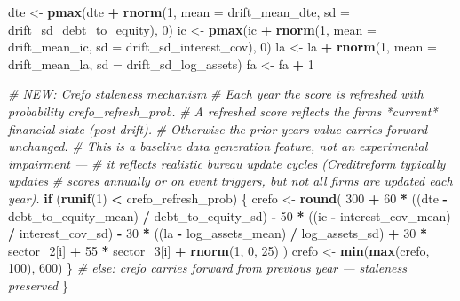 \documentclass[
]{article}
\newenvironment{Shaded}{\begin{snugshade}}{\end{snugshade}}
\newcommand{\AttributeTok}[1]{\textcolor[rgb]{0.13,0.29,0.53}{#1}}
\newcommand{\CommentTok}[1]{\textcolor[rgb]{0.56,0.35,0.01}{\textit{#1}}}
\newcommand{\ControlFlowTok}[1]{\textcolor[rgb]{0.13,0.29,0.53}{\textbf{#1}}}
\newcommand{\DecValTok}[1]{\textcolor[rgb]{0.00,0.00,0.81}{#1}}
\newcommand{\FunctionTok}[1]{\textcolor[rgb]{0.13,0.29,0.53}{\textbf{#1}}}
\newcommand{\NormalTok}[1]{#1}
\newcommand{\OtherTok}[1]{\textcolor[rgb]{0.56,0.35,0.01}{#1}}
\newcommand{\SpecialCharTok}[1]{\textcolor[rgb]{0.81,0.36,0.00}{\textbf{#1}}}
\begin{document}
\begin{Shaded}
\begin{Highlighting}[]
\NormalTok{        dte }\OtherTok{\textless{}{-}} \FunctionTok{pmax}\NormalTok{(dte }\SpecialCharTok{+} \FunctionTok{rnorm}\NormalTok{(}\DecValTok{1}\NormalTok{, }\AttributeTok{mean =}\NormalTok{ drift\_mean\_dte, }\AttributeTok{sd =}\NormalTok{ drift\_sd\_debt\_to\_equity), }\DecValTok{0}\NormalTok{)}
\NormalTok{        ic  }\OtherTok{\textless{}{-}} \FunctionTok{pmax}\NormalTok{(ic  }\SpecialCharTok{+} \FunctionTok{rnorm}\NormalTok{(}\DecValTok{1}\NormalTok{, }\AttributeTok{mean =}\NormalTok{ drift\_mean\_ic,  }\AttributeTok{sd =}\NormalTok{ drift\_sd\_interest\_cov),   }\DecValTok{0}\NormalTok{)}
\NormalTok{        la  }\OtherTok{\textless{}{-}}\NormalTok{      la  }\SpecialCharTok{+} \FunctionTok{rnorm}\NormalTok{(}\DecValTok{1}\NormalTok{, }\AttributeTok{mean =}\NormalTok{ drift\_mean\_la,  }\AttributeTok{sd =}\NormalTok{ drift\_sd\_log\_assets)}
\NormalTok{        fa  }\OtherTok{\textless{}{-}}\NormalTok{ fa }\SpecialCharTok{+} \DecValTok{1}
        
        \CommentTok{\# NEW: Crefo staleness mechanism}
        \CommentTok{\# Each year the score is refreshed with probability crefo\_refresh\_prob.}
        \CommentTok{\# A refreshed score reflects the firm\textquotesingle{}s *current* financial state (post{-}drift).}
        \CommentTok{\# Otherwise the prior year\textquotesingle{}s value carries forward unchanged.}
        \CommentTok{\# This is a baseline data generation feature, not an experimental impairment —}
        \CommentTok{\# it reflects realistic bureau update cycles (Creditreform typically updates}
        \CommentTok{\# scores annually or on event triggers, but not all firms are updated each year).}
        \ControlFlowTok{if}\NormalTok{ (}\FunctionTok{runif}\NormalTok{(}\DecValTok{1}\NormalTok{) }\SpecialCharTok{\textless{}}\NormalTok{ crefo\_refresh\_prob) \{}
\NormalTok{          crefo }\OtherTok{\textless{}{-}} \FunctionTok{round}\NormalTok{(}
            \DecValTok{300}
            \SpecialCharTok{+} \DecValTok{60}  \SpecialCharTok{*}\NormalTok{ ((dte }\SpecialCharTok{{-}}\NormalTok{ debt\_to\_equity\_mean) }\SpecialCharTok{/}\NormalTok{ debt\_to\_equity\_sd)}
            \SpecialCharTok{{-}} \DecValTok{50}  \SpecialCharTok{*}\NormalTok{ ((ic  }\SpecialCharTok{{-}}\NormalTok{ interest\_cov\_mean)   }\SpecialCharTok{/}\NormalTok{ interest\_cov\_sd)}
            \SpecialCharTok{{-}} \DecValTok{30}  \SpecialCharTok{*}\NormalTok{ ((la  }\SpecialCharTok{{-}}\NormalTok{ log\_assets\_mean)      }\SpecialCharTok{/}\NormalTok{ log\_assets\_sd)}
            \SpecialCharTok{+} \DecValTok{30}  \SpecialCharTok{*}\NormalTok{ sector\_2[i]}
            \SpecialCharTok{+} \DecValTok{55}  \SpecialCharTok{*}\NormalTok{ sector\_3[i]}
            \SpecialCharTok{+} \FunctionTok{rnorm}\NormalTok{(}\DecValTok{1}\NormalTok{, }\DecValTok{0}\NormalTok{, }\DecValTok{25}\NormalTok{)}
\NormalTok{          )}
\NormalTok{          crefo }\OtherTok{\textless{}{-}} \FunctionTok{min}\NormalTok{(}\FunctionTok{max}\NormalTok{(crefo, }\DecValTok{100}\NormalTok{), }\DecValTok{600}\NormalTok{)}
\NormalTok{        \}}
        \CommentTok{\# else: crefo carries forward from previous year — staleness preserved}
\NormalTok{      \}}
      

\end{Highlighting}
\end{Shaded}
\end{document}
